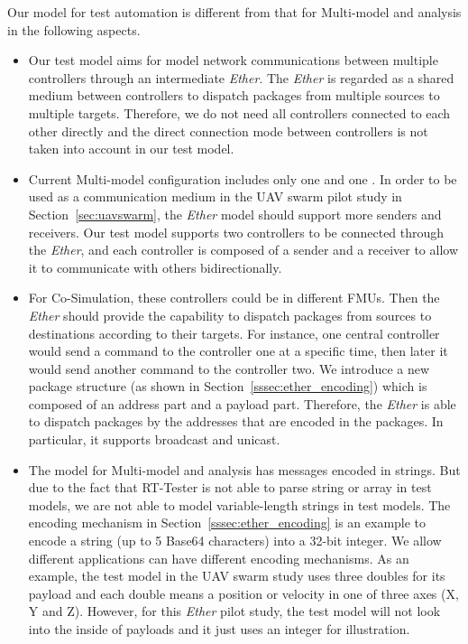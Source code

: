 Our model for test automation is different from that for Multi-model and analysis in the following aspects.
\begin{itemize}
    \item Our test model aims for model network communications between multiple controllers through an intermediate \emph{Ether}. The \emph{Ether} is regarded as a shared medium between controllers to dispatch packages from multiple sources to multiple targets. Therefore, we do not need all controllers connected to each other directly and the direct connection mode between controllers is not taken into account in our test model.
    \item Current Multi-model configuration  includes only one  and one . In order to be used as a communication medium in the UAV swarm pilot study in Section~\ref{sec:uavswarm}, the \emph{Ether} model should support more senders and receivers. Our test model supports two controllers to be connected through the \emph{Ether}, and each controller is composed of a sender and a receiver to allow it to communicate with others bidirectionally.
    \item For Co-Simulation, these controllers could be in different FMUs. Then the \emph{Ether} should provide the capability to dispatch packages from sources to destinations according to their targets. For instance, one central controller would send a command to the controller one at a specific time, then later it would send another command to the controller two. We introduce a new package structure (as shown in Section~\ref{sssec:ether_encoding}) which is composed of an address part and a payload part. Therefore, the \emph{Ether} is able to dispatch packages by the addresses that are encoded in the packages. In particular, it supports broadcast and unicast.
    \item The model for Multi-model and analysis has messages encoded in strings. But due to the fact that RT-Tester is not able to parse string or array in test models, we are not able to model variable-length strings in test models. The encoding mechanism in Section~\ref{sssec:ether_encoding} is an example to encode a string (up to 5 Base64 characters) into a 32-bit integer. We allow different applications can have different encoding mechanisms. As an example, the test model in the UAV swarm study uses three doubles for its payload and each double means a position or velocity in one of three axes (X, Y and Z). However, for this \emph{Ether} pilot study, the test model will not look into the inside of payloads and it just uses an integer for illustration.
\end{itemize}

